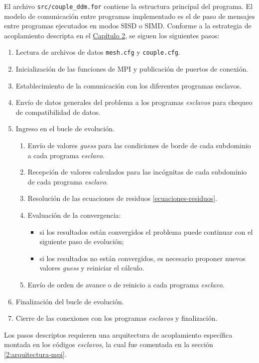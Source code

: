 El archivo \texttt{src/couple\_ddm.for} contiene la estructura principal del programa.
El modelo de comunicación entre programas implementado es el de paso de mensajes entre programas ejecutados en modos SISD o SIMD.
Conforme a la estrategia de acoplamiento descripta en el \hyperlink{chapter.2}{Capítulo 2}, se siguen los siguientes pasos:
\begin{enumerate}
\item Lectura de archivos de datos \texttt{mesh.cfg} y \texttt{couple.cfg}.
\item Inicialización de las funciones de MPI y publicación de puertos de conexión.
\item Establecimiento de la comunicación con los diferentes programas esclavos.
\item Envío de datos generales del problema a los programas \textit{esclavos} para chequeo de compatibilidad de datos.
\item Ingreso en el bucle de evolución.
\begin{enumerate}
\item Envío de valores \textit{guess} para las condiciones de borde de cada subdominio a cada programa \textit{esclavo}.
\item Recepción de valores calculados para las incógnitas de cada subdominio de cada programa \textit{esclavo}.
\item Resolución de las ecuaciones de residuos \ref{ecuaciones-residuos}.
\item Evaluación de la convergencia:
\begin{itemize}
\item si los resultados están convergidos el problema puede continuar con el siguiente paso de evolución;
\item si los resultados no están convergidos, es necesario proponer nuevos valores \textit{guess} y reiniciar el cálculo.
\end{itemize}
\item Envío de orden de avance o de reinicio a cada programa \textit{esclavo}.
\end{enumerate}
\item Finalización del bucle de evolución.
\item Cierre de las conexiones con los programas \textit{esclavos} y finalización.
\end{enumerate}
Los pasos descriptos requieren una arquitectura de acoplamiento específica montada en los códigos \textit{esclavos}, la cual fue comentada en la sección \ref{2:arquitectura-mpi}.

